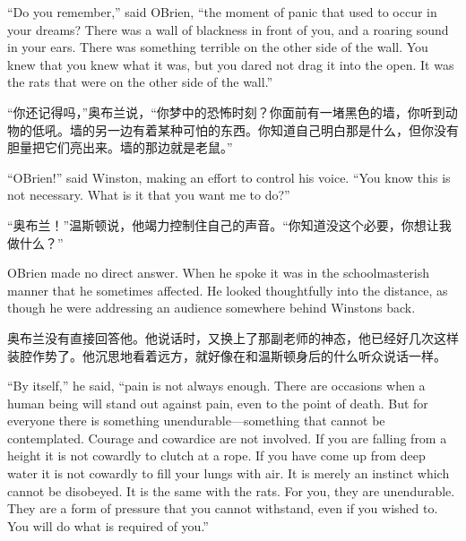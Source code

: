 \begin{paracol}{2}
\switchcolumn*

``Do you remember,'' said O\textquotesingle Brien, ``the moment of panic
that used to occur in your dreams? There was a wall of blackness in
front of you, and a roaring sound in your ears. There was something
terrible on the other side of the wall. You knew that you knew what it
was, but you dared not drag it into the open. It was the rats that were
on the other side of the wall.''

\switchcolumn

``你还记得吗，''奥布兰说，``你梦中的恐怖时刻？你面前有一堵黑色的墙，你听到动物的低吼。墙的另一边有着某种可怕的东西。你知道自己明白那是什么，但你没有胆量把它们亮出来。墙的那边就是老鼠。''

\switchcolumn*

``O\textquotesingle Brien!'' said Winston, making an effort to control his
voice. ``You know this is not necessary. What is it that you want me to
do?''

\switchcolumn

``奥布兰！''温斯顿说，他竭力控制住自己的声音。``你知道没这个必要，你想让我做什么？''

\switchcolumn*

O\textquotesingle Brien made no direct answer. When he spoke it was in
the schoolmasterish manner that he sometimes affected. He looked
thoughtfully into the distance, as though he were addressing an audience
somewhere behind Winston\textquotesingle s back.

\switchcolumn

奥布兰没有直接回答他。他说话时，又换上了那副老师的神态，他已经好几次这样装腔作势了。他沉思地看着远方，就好像在和温斯顿身后的什么听众说话一样。

\switchcolumn*

``By itself,'' he said, ``pain is not always enough. There are occasions
when a human being will stand out against pain, even to the point of
death. But for everyone there is something unendurable---something that
cannot be contemplated. Courage and cowardice are not involved. If you
are falling from a height it is not cowardly to clutch at a rope. If you
have come up from deep water it is not cowardly to fill your lungs with
air. It is merely an instinct which cannot be disobeyed. It is the same
with the rats. For you, they are unendurable. They are a form of
pressure that you cannot withstand, even if you wished to. You will do
what is required of you.''

\switchcolumn


\end{paracol}
